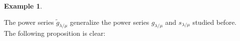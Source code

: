 \documentclass[12pt]{article}
\theoremstyle{plain}
\theoremstyle{definition}
\newtheorem{example}[theorem]{Example}
\let\sumnonlimits\sum
\renewcommand{\sum}{\sumnonlimits\limits}
\def\lm{{\lambda/\mu}}
\begin{document}
\begin{example}
\begin{enumerate}
\begin{comment}
\item[\textbf{(c)}] Let now $n=3$, let $\lambda=\left(  2,1\right)  $ and let
$\mu=\varnothing$. Then, the rpps $T$ of shape $\lm$
have the form $%
\ytableausetup{notabloids}
\begin{ytableau}
a & b \\
c
\end{ytableau}%
$ with $a\leq b$ and $a\leq c$. Each such rpp $T$ satisfies $\mathbf{t}%
^{\operatorname*{ceq}\left(  T\right)  }=\left\{
\begin{array}
[c]{c}%
1,\text{ if }a<c;\\
t_{1},\text{ if }a=c
\end{array}
\right.  $ and $\mathbf{x}^{\operatorname*{ircont}\left(  T\right)  }=\left\{
%
\begin{array}
[c]{c}%
x_{a}x_{b}x_{c},\ \text{if }a<c;\\
x_{a}x_{b},\ \text{if }a=c
\end{array}
\right.  $. Thus,%
\begin{align*}
\widetilde{g}_{\lambda/\mu}  &  =\sum_{\substack{T\text{ is an rpp}\\\text{of
shape }\lm }}\mathbf{t}^{\operatorname*{ceq}\left(
T\right)  }\mathbf{x}^{\operatorname*{ircont}\left(  T\right)  }=\sum_{a\leq
b;\ a\leq c}\left\{
\begin{array}
[c]{c}%
1,\text{ if }a<c;\\
t_{1},\text{ if }a=c
\end{array}
\right.  \left\{
\begin{array}
[c]{c}%
x_{a}x_{b}x_{c},\ \text{if }a<c;\\
x_{a}x_{b},\ \text{if }a=c
\end{array}
\right. \\
&  =\sum_{a\leq b;\ a<c}x_{a}x_{b}x_{c}+t_{1}\sum_{a\leq b}x_{a}x_{b}.
\end{align*}

\end{comment}
\end{enumerate}

\end{example}

The power series $\widetilde{g}_{\lambda/\mu}$ generalize the power series
$g_{\lambda/\mu}$ and $s_{\lambda/\mu}$ studied before. The following proposition is clear:
\end{document}
